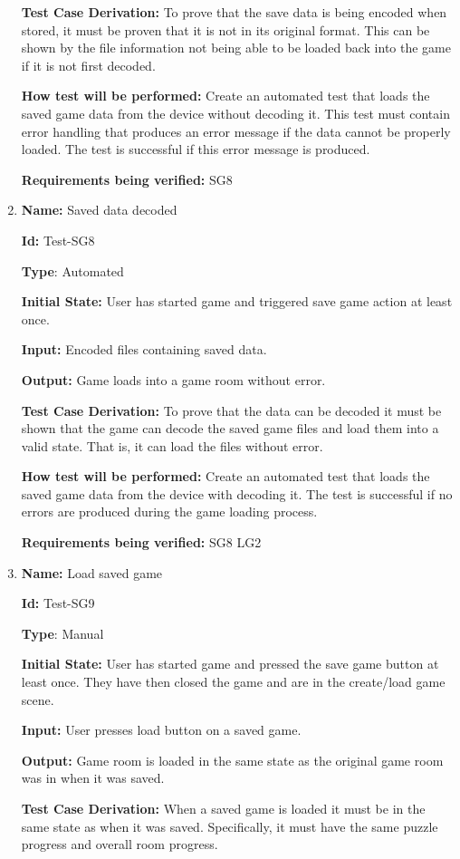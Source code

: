 \documentclass[12pt, titlepage]{article}
\begin{document}
\begin{enumerate}
\textbf{Test Case Derivation:}
To prove that the save data is being encoded when stored, it must be proven that it is not in its original format. This can be shown by the file information not being able to be loaded back into the game if it is not first decoded.

\textbf{How test will be performed:}
Create an automated test that loads the saved game data from the device without decoding it. This test must contain error handling that produces an error message if the data cannot be properly loaded. The test is successful if this error message is produced.

\textbf{Requirements being verified: } SG8

\item{\textbf{Name:} Saved data decoded}

\textbf{Id:} Test-SG8

\textbf{Type}: Automated

\textbf{Initial State:} User has started game and triggered save game action at least once.

\textbf{Input:} Encoded files containing saved data.

\textbf{Output:} Game loads into a game room without error.

\textbf{Test Case Derivation:}
To prove that the data can be decoded it must be shown that the game can decode the saved game files and load them into a valid state. That is, it can load the files without error.

\textbf{How test will be performed:}
Create an automated test that loads the saved game data from the device with decoding it. The test is successful if no errors are produced during the game loading process.

\textbf{Requirements being verified: } SG8 LG2

\item{\textbf{Name:} Load saved game}

\textbf{Id:} Test-SG9

\textbf{Type}: Manual

\textbf{Initial State:} User has started game and pressed the save game button at least once. They have then closed the game and are in the create/load game scene. 

\textbf{Input:} User presses load button on a saved game.

\textbf{Output:} Game room is loaded in the same state as the original game room was in when it was saved.

\textbf{Test Case Derivation:}
When a saved game is loaded it must be in the same state as when it was saved. Specifically, it must have the same puzzle progress and overall room progress.


\end{enumerate}
\end{document}
